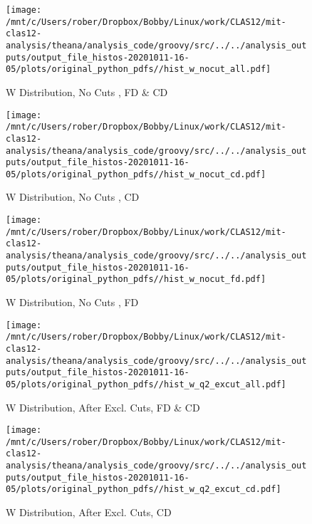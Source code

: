\documentclass{article}
\begin{document}
\begin{landscape}
    \begin{figure}[h]
        \centering

        \texttt{[image: /mnt/c/Users/rober/Dropbox/Bobby/Linux/work/CLAS12/mit-clas12-analysis/theana/analysis\_code/groovy/src/../../analysis\_outputs/output\_file\_histos-20201011-16-05/plots/original\_python\_pdfs//hist\_w\_nocut\_all.pdf]}
        \captionsetup{textformat=empty,labelformat=blank}
        \caption{W Distribution, No Cuts , FD \& CD}
    \end{figure}
    \clearpage
    
    \begin{figure}[h]
        \centering

        \texttt{[image: /mnt/c/Users/rober/Dropbox/Bobby/Linux/work/CLAS12/mit-clas12-analysis/theana/analysis\_code/groovy/src/../../analysis\_outputs/output\_file\_histos-20201011-16-05/plots/original\_python\_pdfs//hist\_w\_nocut\_cd.pdf]}
        \captionsetup{textformat=empty,labelformat=blank}
        \caption{W Distribution, No Cuts , CD}
    \end{figure}
    \clearpage
    
    \begin{figure}[h]
        \centering

        \texttt{[image: /mnt/c/Users/rober/Dropbox/Bobby/Linux/work/CLAS12/mit-clas12-analysis/theana/analysis\_code/groovy/src/../../analysis\_outputs/output\_file\_histos-20201011-16-05/plots/original\_python\_pdfs//hist\_w\_nocut\_fd.pdf]}
        \captionsetup{textformat=empty,labelformat=blank}
        \caption{W Distribution, No Cuts , FD}
    \end{figure}
    \clearpage
    
    \begin{figure}[h]
        \centering

        \texttt{[image: /mnt/c/Users/rober/Dropbox/Bobby/Linux/work/CLAS12/mit-clas12-analysis/theana/analysis\_code/groovy/src/../../analysis\_outputs/output\_file\_histos-20201011-16-05/plots/original\_python\_pdfs//hist\_w\_q2\_excut\_all.pdf]}
        \captionsetup{textformat=empty,labelformat=blank}
        \caption{W Distribution, After Excl. Cuts, FD \& CD}
    \end{figure}
    \clearpage
    
    \begin{figure}[h]
        \centering

        \texttt{[image: /mnt/c/Users/rober/Dropbox/Bobby/Linux/work/CLAS12/mit-clas12-analysis/theana/analysis\_code/groovy/src/../../analysis\_outputs/output\_file\_histos-20201011-16-05/plots/original\_python\_pdfs//hist\_w\_q2\_excut\_cd.pdf]}
        \captionsetup{textformat=empty,labelformat=blank}
        \caption{W Distribution, After Excl. Cuts, CD}
    \end{figure}
    \clearpage
    

\end{landscape}
\end{document}
